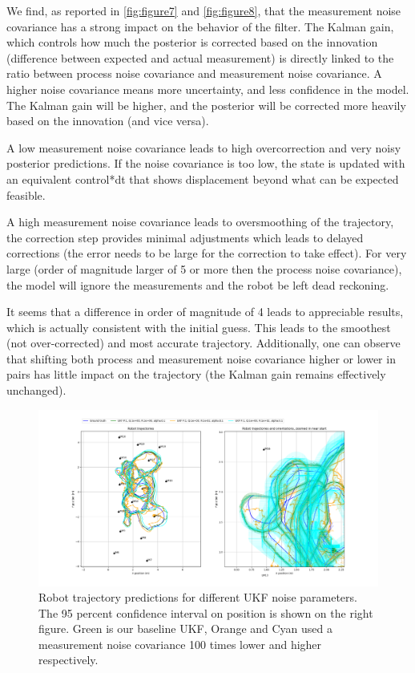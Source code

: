 \documentclass{article}
\begin{document}
We find, as reported in \autoref{fig:figure7} and \autoref{fig:figure8}, that the measurement noise covariance has a strong impact on the behavior of the filter. The Kalman gain, which controls how much the posterior is corrected based on the innovation (difference between expected and actual measurement) is directly linked to the ratio between process noise covariance and measurement noise covariance. A higher noise covariance means more uncertainty, and less confidence in the model. The Kalman gain will be higher, and the posterior will be corrected more heavily based on the innovation (and vice versa).

A low measurement noise covariance leads to high overcorrection and very noisy posterior predictions. If the noise covariance is too low, the state is updated with an equivalent control*dt that shows displacement beyond what can be expected feasible.

A high measurement noise covariance leads to oversmoothing of the trajectory, the correction step provides minimal adjustments which leads to delayed corrections (the error needs to be large for the correction to take effect). For very large (order of magnitude larger of 5 or more then the process noise covariance), the model will ignore the measurements and the robot be left dead reckoning.

It seems that a difference in order of magnitude of 4 leads to appreciable results, which is actually consistent with the initial guess. This leads to the smoothest (not over-corrected) and most accurate trajectory. Additionally, one can observe that shifting both process and measurement noise covariance higher or lower in pairs has little impact on the trajectory (the Kalman gain remains effectively unchanged).

\begin{figure}
\centering
\includegraphics[width=\textwidth]{Figure_6.png}
\caption{Robot trajectory predictions for different UKF noise parameters. The 95 percent confidence interval on position is shown on the right figure. Green is our baseline UKF, Orange and Cyan used a measurement noise covariance 100 times lower and higher respectively.}
\label{fig:figure6}
\end{figure}
\end{document}
